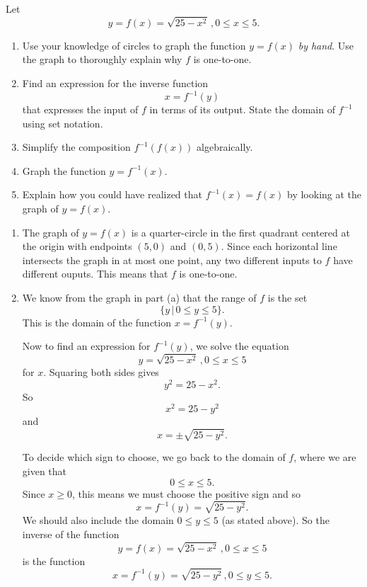 \documentclass{ximera}
\begin{document}
\begin{example} \label{Ex98:Quadratics}
Let 
\[
    y=   f(x) = \sqrt{25-x^2} \, , 0\leq x \leq 5 .
\]
\begin{enumerate}
\item Use your knowledge of circles to graph the function $y=f(x)$ \emph{by hand}. Use the graph to thoroughly explain why $f$ is one-to-one.

\item Find an expression for the inverse function
\[
    x = f^{-1}(y)
\]
that expresses the input of $f$ in terms of its output. State the domain of $f^{-1}$ using set notation.

\item Simplify the composition $f^{-1}(f(x))$ algebraically.

\item Graph the function $y=f^{-1}(x)$. 

\item Explain how you could have realized that $f^{-1}(x) = f(x)$ by looking at the graph of $y=f(x)$.
\end{enumerate}


\begin{explanation}
\begin{enumerate}
\item The graph of $y=f(x)$ is a quarter-circle in the first quadrant centered at the origin with endpoints $(5,0)$ and $(0,5)$. Since each horizontal line intersects the graph in at most one point, any two different inputs to $f$ have different ouputs. This means that $f$ is one-to-one.

\item We know from the graph in part (a) that the range of $f$ is the set
\[
   \{ y \, | \,  0\leq y \leq 5 \} .
\]
This is the domain of the function $x=f^{-1}(y)$.

Now to find an expression for $f^{-1}(y)$, we solve the equation
\[
   y=   \sqrt{25-x^2} \, , 0\leq x \leq 5 
\]
for $x$. Squaring both sides gives
\[
   y^2 = 25 - x^2 .
\]
So 
\[
     x^2 = 25-y^2
\]
and 
\[
   x  = \pm \sqrt{25-y^2} .
\]

To decide which sign to choose, we go back to the domain of $f$, where we are given that 
\[
     0 \leq x \leq 5 .
\]
Since $x\geq 0$, this means we must choose the positive sign and so
\[
    x = f^{-1}(y) = \sqrt{25-y^2}.
\]
We should also include the domain $0\leq y \leq 5$ (as stated above). So the inverse of the function
\[
    y=   f(x) = \sqrt{25-x^2} \, , 0\leq x \leq 5 
\]
is the function
\[
    x = f^{-1}(y) = \sqrt{25-y^2} \, , 0\leq y \leq 5 .
\]


\end{enumerate}
\end{explanation}
\end{example}
\end{document}
